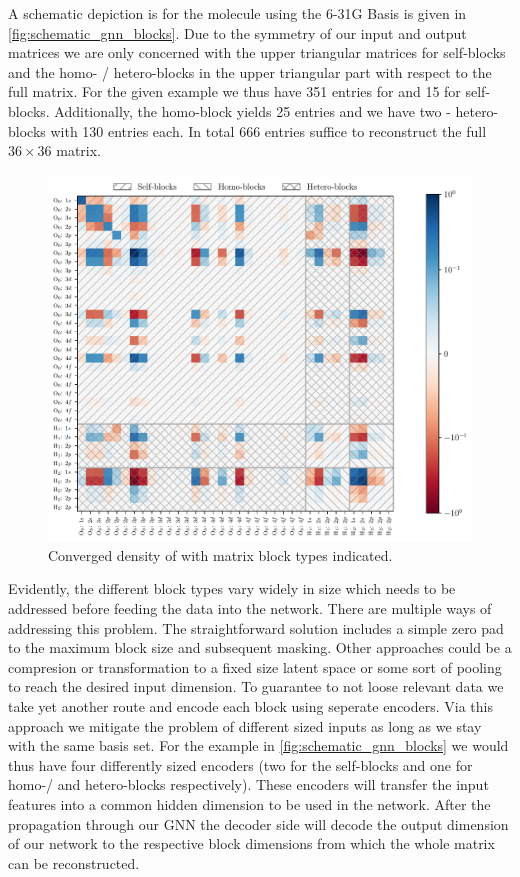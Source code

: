 A schematic depiction is for the  molecule using the 6-31G Basis is given in \autoref{fig:schematic_gnn_blocks}. Due to the symmetry of our input and output matrices we are only concerned with the upper triangular matrices for self-blocks and the homo- / hetero-blocks in the upper triangular part with respect to the full matrix. For the given example we thus have 351 entries for  and 15 for  self-blocks. Additionally, the  homo-block yields 25 entries and we have two - hetero-blocks with 130 entries each. In total 666 entries suffice to reconstruct the full $36 \times 36$ matrix. 
\begin{figure}[H]
    \centering
    \includegraphics[width=\textwidth]{../fig/gnn/schematic_blocks.pdf}
    \caption[Matrix block regions of ]{Converged density of  with matrix block types indicated.}
    \label{fig:schematic_gnn_blocks}
\end{figure}
Evidently, the different block types vary widely in size which needs to be addressed before feeding the data into the network. There are multiple ways of addressing this problem. The straightforward solution includes a simple zero pad to the maximum block size and subsequent masking. Other approaches could be a compresion or transformation to a fixed size latent space or some sort of pooling to reach the desired input dimension. To guarantee to not loose relevant data we take yet another route and encode each block using seperate encoders. Via this approach we mitigate the problem of different sized inputs as long as we stay with the same basis set. For the example in \autoref{fig:schematic_gnn_blocks} we would thus have four differently sized encoders (two for the self-blocks and one for homo-/ and hetero-blocks respectively). These encoders will transfer the input features into a common hidden dimension to be used in the network. After the propagation through our GNN the decoder side will decode the output dimension of our network to the respective block dimensions from which the whole matrix can be reconstructed.
